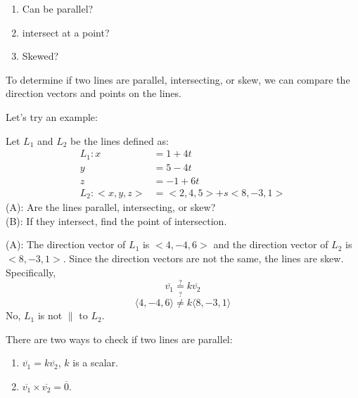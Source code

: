 \documentclass{article}
\begin{document}
\begin{notebox}
\begin{enumerate}
    \item Can be parallel?
    \item intersect at a point?
    \item Skewed?
\end{enumerate}
\end{notebox}

\begin{tipbox}
To determine if two lines are parallel, intersecting, or skew, we can compare the direction vectors and points on the lines.
\end{tipbox}

Let's try an example:
\begin{examplebox}
Let \( L_1 \) and \( L_2 \) be the lines defined as:
\[
    \begin{aligned}
        L_1: x &= 1 + 4t \\
        y &= 5 - 4t \\
        z &= -1 + 6t \\
        L_2: <x, y, z> &= <2, 4, 5> + s<8, -3, 1>
    \end{aligned}
\]
(A): Are the lines parallel, intersecting, or skew? \\
(B): If they intersect, find the point of intersection.

\begin{solutionbox}
(A): The direction vector of \( L_1 \) is \( <4, -4, 6> \) and the direction vector of \( L_2 \) is \( <8, -3, 1> \). Since the direction vectors are not the same, the lines are skew. \\
Specifically,
\[
    \overline{v_1} \stackrel{?}{=} k\overline{v_2}
\]
\[
    \langle 4, -4, 6 \rangle \stackrel{?}{\neq} k \langle 8, -3, 1 \rangle
\]
No, \( L_1 \) is not \( \parallel \) to \( L_2 \). \\

\begin{notebox}
There are two ways to check if two lines are parallel:
\begin{enumerate}
    \item \( \overline{v_1} = k\overline{v_2} \), \( k \) is a scalar.
    \item \( \overline{v_1} \times \overline{v_2} = \overline{0} \).
\end{enumerate}
\end{notebox}


\end{solutionbox}
\end{examplebox}
\end{document}
